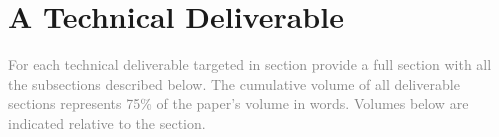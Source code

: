 \section{ A Technical Deliverable } 

\textcolor{gray}{For each technical deliverable targeted in section provide a
full section with all the subsections described below. The cumulative volume of
all deliverable sections represents 75\% of the paper's volume in words. Volumes
below are indicated relative to the section.}

